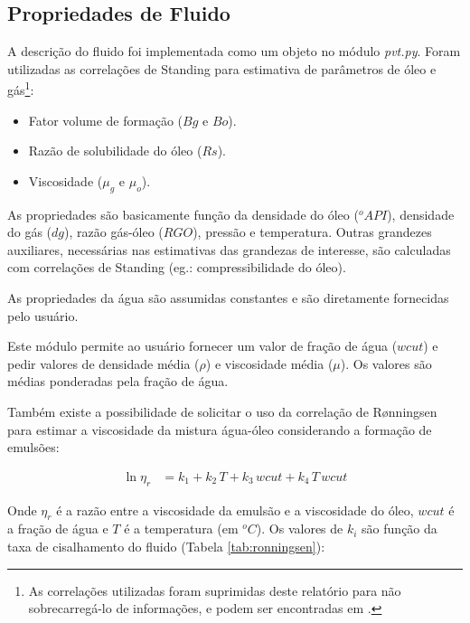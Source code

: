\documentclass[final,5p]{elsarticle}
\numberwithin{equation}{section}
\begin{document}
    \subsection{Propriedades de Fluido}

        A descrição do fluido foi implementada como um objeto no módulo \emph{pvt.py}. Foram utilizadas as correlações de Standing\cite{standing1952volumetric} para estimativa de parâmetros de óleo e gás\footnote{As correlações utilizadas foram suprimidas deste relatório para não sobrecarregá-lo de informações, e podem ser encontradas em \cite{rosa2006engenharia}.}:

        \begin{itemize}
            \item Fator volume de formação ($Bg$ e $Bo$).
            \item Razão de solubilidade do óleo ($Rs$).
            \item Viscosidade ($\mu_g$ e $\mu_o$).
        \end{itemize}

        As propriedades são basicamente função da densidade do óleo ($^oAPI$), densidade do gás ($dg$), razão gás-óleo ($RGO$), pressão e temperatura. Outras grandezes auxiliares, necessárias nas estimativas das grandezas de interesse, são calculadas com correlações de Standing (eg.: compressibilidade do óleo).

        As propriedades da água são assumidas constantes e são diretamente fornecidas pelo usuário.

        Este módulo permite ao usuário fornecer um valor de fração de água ($wcut$) e pedir valores de densidade média ($\rho$) e viscosidade média ($\mu$). Os valores são médias ponderadas pela fração de água.

        Também existe a possibilidade de solicitar o uso da correlação de Rønningsen para estimar a viscosidade da mistura água-óleo considerando a formação de emulsões\cite{doi:10.1021/ef00041a001}:

        \begin{align}
            \ln \eta_r &= k_1 + k_2 \, T + k_3 \, wcut  + k_4 \, T \, wcut
        \end{align}

        Onde $\eta_r$ é a razão entre a viscosidade da emulsão e a viscosidade do óleo, $wcut$ é a fração de água e $T$ é a temperatura (em $^oC$). Os valores de $k_i$ são função da taxa de cisalhamento do fluido (Tabela \ref{tab:ronningsen}):
\end{document}
